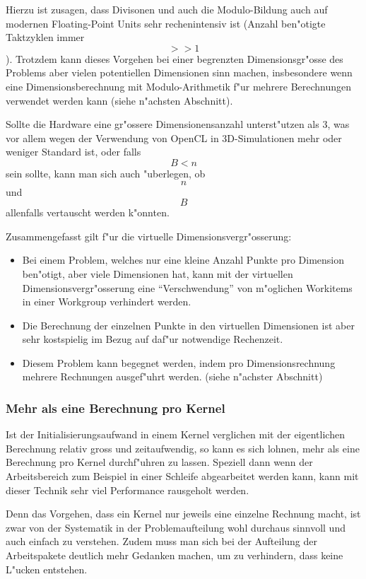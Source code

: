 \begin{refsection}
Hierzu ist zusagen, dass Divisonen und auch die Modulo-Bildung auch auf
modernen Floating-Point Units sehr rechenintensiv ist (Anzahl ben"otigte 
Taktzyklen immer \[ >> 1 \]). Trotzdem kann dieses Vorgehen bei einer 
begrenzten Dimensionsgr"osse des Problems aber vielen potentiellen 
Dimensionen sinn machen, insbesondere wenn eine Dimensionsberechnung mit
Modulo-Arithmetik f"ur mehrere Berechnungen verwendet werden kann
(siehe n"achsten Abschnitt).

Sollte die Hardware eine gr"ossere Dimensionensanzahl unterst"utzen als 
3, was vor allem wegen der Verwendung von OpenCL in 3D-Simulationen
mehr oder weniger Standard ist, oder falls \[ B < n \] sein sollte, 
kann man sich auch "uberlegen, ob \[ n \] und \[ B \] allenfalls vertauscht
werden k"onnten.

Zusammengefasst gilt f"ur die virtuelle Dimensionsvergr"osserung:

\begin{itemize}
 \item Bei einem Problem, welches nur eine kleine Anzahl Punkte pro 
       Dimension ben"otigt, aber viele Dimensionen hat, kann mit der
       virtuellen Dimensionsvergr"osserung eine ``Verschwendung'' von
       m"oglichen Workitems in einer Workgroup verhindert werden.
 \item Die Berechnung der einzelnen Punkte in den virtuellen 
       Dimensionen ist aber sehr kostspielig im Bezug auf daf"ur notwendige
       Rechenzeit.
 \item Diesem Problem kann begegnet werden, indem pro Dimensionsrechnung
       mehrere Rechnungen ausgef"uhrt werden. (siehe n"achster Abschnitt)
\end{itemize}


\subsubsection{Mehr als eine Berechnung pro Kernel}

Ist der Initialisierungsaufwand in einem Kernel verglichen mit der eigentlichen
Berechnung relativ gross und zeitaufwendig, so kann es sich lohnen, mehr als 
eine Berechnung pro Kernel durchf"uhren zu lassen. Speziell dann wenn der 
Arbeitsbereich zum Beispiel in einer Schleife abgearbeitet werden kann, kann
mit dieser Technik sehr viel Performance rausgeholt werden.

Denn das Vorgehen, dass ein Kernel nur jeweils eine einzelne Rechnung macht, 
ist zwar von der Systematik in der Problemaufteilung wohl durchaus sinnvoll 
und auch einfach zu verstehen. Zudem muss man sich bei der Aufteilung der
Arbeitspakete deutlich mehr Gedanken machen, um zu verhindern, dass keine
L"ucken entstehen.


\end{refsection}
